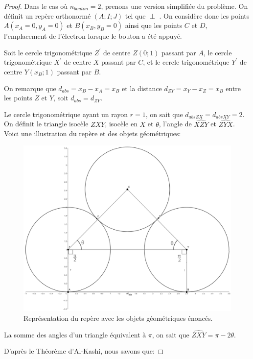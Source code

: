 \documentclass{amsart}
\theoremstyle{definition}
\theoremstyle{remark}
\numberwithin{equation}{section}
\renewcommand*{\overrightarrow}[1]{\vbox{\halign{##\cr 
  \tiny\rightarrowfill\cr\noalign{\nointerlineskip\vskip1pt} 
  $#1\mskip2mu$\cr}}}
\begin{document}
\begin{proof}
  Dans le cas où $n_{bouton}=2$, prenons une version simplifiée du problème. On définit un repère orthonormé $(A;I;J)$ tel que \overrightarrow{AJ} $\perp$ \overrightarrow{AB}. On considère donc les points $A(x_A=0,y_A=0)$ et $B(x_B,y_B=0)$ ainsi que les points $C$ et $D$, l'emplacement de l'électron lorsque le bouton a été appuyé.

  Soit le cercle trigonométrique $Z^\prime$ de centre $Z(0;1)$ passant par $A$, le cercle trigonométrique $X^\prime$ de centre $X$ passant par $C$, et le cercle trigonométrique $Y^\prime$ de centre $Y(x_B;1)$ passant par $B$.

  On remarque que $d_{abs}=x_B-x_A=x_B$ et la distance $d_{ZY}=x_Y-x_Z=x_B$ entre les points $Z$ et $Y$, soit $d_{abs}=d_{ZY}$.

  Le cercle trigonométrique ayant un rayon $r=1$, on sait que $d_{abs ZX}=d_{abs XY}=2$. On définit le triangle isocèle $ZXY$, isocèle en $X$ et $\theta$, l'angle de $\widehat{XZY}$ et $\widehat{ZYX}$. Voici une illustration du repère et des objets géométriques:

  \begin{figure}[H]
    \centering
    \includegraphics[scale=0.2]{images/three_circles.png}
    \caption{Représentation du repère avec les objets géométriques énoncés.}
  \end{figure}

  La somme des angles d'un triangle équivalent à $\pi$, on sait que $\widehat{ZXY}=\pi-2\theta$.

  D'après le Théorème d'Al-Kashi, nous savons que:


\end{proof}
\end{document}
